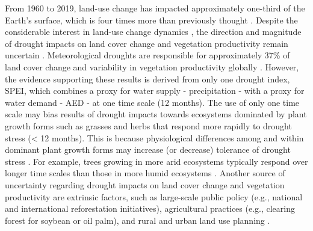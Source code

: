 \documentclass[
  sn-nature,
  numbered]{sn-jnl}
\begin{document}
From 1960 to 2019, land-use change has impacted approximately one-third
of the Earth's surface, which is four times more than previously thought
\citep{Winkler2021}. Despite the considerable interest in land-use
change dynamics \citep[e.g.,][]{Song2018, Winkler2021}, the direction
and magnitude of drought impacts on land cover change and vegetation
productivity remain uncertain \citep{Chen2022, Akinyemi2021, Peng2017}.
Meteorological droughts are responsible for approximately 37\% of land
cover change and variability in vegetation productivity globally
\citep{Peng2017}. However, the evidence supporting these results is
derived from only one drought index, SPEI, which combines a proxy for
water supply - precipitation - with a proxy for water demand - AED - at
one time scale (12 months). The use of only one time scale may bias
results of drought impacts towards ecosystems dominated by plant growth
forms such as grasses and herbs that respond more rapidly to drought
stress (\textless{} 12 months). This is because physiological
differences among and within dominant plant growth forms may increase
(or decrease) tolerance of drought stress
\citep{Craine2013, McDowell2022}. For example, trees growing in more
arid ecosystems typically respond over longer time scales than those in
more humid ecosystems \citep{Vicente-Serrano2014}. Another source of
uncertainty regarding drought impacts on land cover change and
vegetation productivity are extrinsic factors, such as large-scale
public policy (e.g., national and international reforestation
initiatives), agricultural practices (e.g., clearing forest for soybean
or oil palm), and rural and urban land use planning
\citep{Karabulut2023}.
\end{document}
